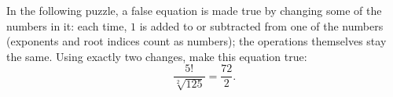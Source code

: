 In the following puzzle, a false equation is made true by changing some of the numbers in it: each time, $1$ is added to or subtracted from one of the numbers (exponents and root indices count as numbers); the operations themselves stay the same. Using exactly two changes, make this equation true:
\[\dfrac{5!}{\sqrt[2]{125}}=\dfrac{72}{2}.\]

